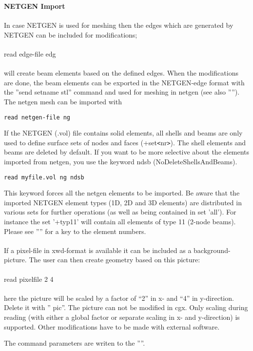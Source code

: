 \documentclass{article}
\begin{document}
\textbf{NETGEN Import}\\\\
In case NETGEN is used for meshing then the edges which are generated by NETGEN can be included for modifications;\\\\read edge-file edg\\\\will create beam elements based on the defined edges. When the modifications are done, the beam elements can be exported in the NETGEN-edge format with the ''send setname stl'' command and used for meshing in netgen (see also ''''). The netgen mesh can be imported with
\begin{verbatim}
read netgen-file ng
\end{verbatim}
If the NETGEN (.vol) file contains solid elements, all shells and beams are only used to define surface sets of nodes and faces (+set\verb_<_nr\verb_>_). The shell elements and beams are deleted by default. If you want to be more selective about the elements imported from netgen, you use the keyword ndsb (NoDeleteShellsAndBeams).
\begin{verbatim}
read myfile.vol ng ndsb
\end{verbatim}
This keyword forces all the netgen elements to be imported. Be aware that the imported NETGEN element types (1D, 2D and 3D elements) are distributed in various sets for further operations (as well as being contained in set 'all'). For instance the set '+typ11' will contain all elements of type 11 (2-node beams). Please see '''' for a key to the element numbers.\\\\

If a pixel-file in xwd-format is available it can be included as a background-picture. The user can then create geometry based on this picture:\\\\read pixelfile 2 4\\\\here the picture will be scaled by a factor of ``2'' in x- and ``4'' in y-direction. Delete it with '' pic''. The picture can not be modified in cgx. Only scaling during reading (with either a global factor or separate scaling in x- and y-direction) is supported. Other modifications have to be made with external software.

The command parameters are writen to the ''''.
\end{document}
